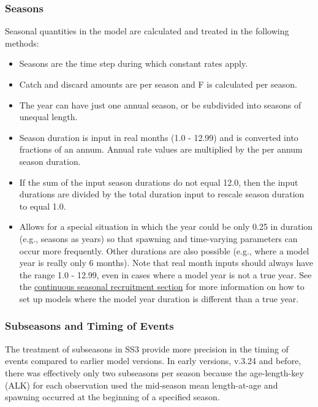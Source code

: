 \subsubsection{Seasons}
Seasonal quantities in the model are calculated and treated in the following methods:
	 \begin{itemize}
	 	\item Seasons are the time step during which constant rates apply.
	 	\item Catch and discard amounts are per season and F is calculated per season.
	 	\item The year can have just one annual season, or be subdivided into seasons of unequal length.
	 	\item Season duration is input in real months (1.0 - 12.99) and is converted into fractions of an annum.  Annual rate values are multiplied by the per annum season duration.
	 	\item If the sum of the input season durations do not equal 12.0, then the input durations are divided by the total duration input to rescale season duration to equal 1.0.  
	 	\item Allows for a special situation in which the year could be only 0.25 in duration (e.g., seasons as years) so that spawning and time-varying parameters can occur more frequently.	Other durations are also possible (e.g., where a model year is really only 6 months). Note that real month inputs should always have the range 1.0 - 12.99, even in cases where a model year is not a true year. See the \hyperlink{continuous-seasonal-recruitment-sec}{continuous seasonal recruitment section} for more information on how to set up models where the model year duration is different than a true year.
	 \end{itemize}

\subsubsection{Subseasons and Timing of Events}
\hypertarget{SubSeas}{}
The treatment of subseasons in SS3 provide more precision in the timing of events compared to earlier model versions. In early versions, v.3.24 and before, there was effectively only two subseasons per season because the age-length-key (ALK) for each observation used the mid-season mean length-at-age and spawning occurred at the beginning of a specified season.  

